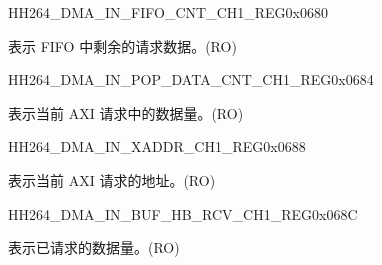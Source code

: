 \begin{register}{H}{H264\_DMA\_IN\_FIFO\_CNT\_CH1\_REG}{0x0680}\label{regdesc:H264DMAINFIFOCNTCH1REG}
%
%
\regnewline%
\begin{regdesc}\begin{reglist}
\label{fielddesc:H264DMAINCMDFIFOINFIFOCNTCH1}\item [H264\_DMA\_IN\_CMDFIFO\_INFIFO\_CNT\_CH1] 表示 FIFO 中剩余的请求数据。(RO)
\end{reglist}\end{regdesc}
\end{register}


\begin{register}{H}{H264\_DMA\_IN\_POP\_DATA\_CNT\_CH1\_REG}{0x0684}\label{regdesc:H264DMAINPOPDATACNTCH1REG}
%
%
\regnewline%
\begin{regdesc}\begin{reglist}
\label{fielddesc:H264DMAINCMDFIFOPOPDATACNTCH1}\item [H264\_DMA\_IN\_CMDFIFO\_POP\_DATA\_CNT\_CH1] 表示当前 AXI 请求中的数据量。(RO)
\end{reglist}\end{regdesc}
\end{register}


\begin{register}{H}{H264\_DMA\_IN\_XADDR\_CH1\_REG}{0x0688}\label{regdesc:H264DMAINXADDRCH1REG}
%
\regnewline%
\begin{regdesc}\begin{reglist}
\label{fielddesc:H264DMAINCMDFIFOXADDRCH1}\item [H264\_DMA\_IN\_CMDFIFO\_XADDR\_CH1] 表示当前 AXI 请求的地址。(RO)
\end{reglist}\end{regdesc}
\end{register}


\begin{register}{H}{H264\_DMA\_IN\_BUF\_HB\_RCV\_CH1\_REG}{0x068C}\label{regdesc:H264DMAINBUFHBRCVCH1REG}
%
%
\regnewline%
\begin{regdesc}\begin{reglist}
\label{fielddesc:H264DMAINCMDFIFOBUFHBRCVCH1}\item [H264\_DMA\_IN\_CMDFIFO\_BUF\_HB\_RCV\_CH1] 表示已请求的数据量。(RO)
\end{reglist}\end{regdesc}
\end{register}


